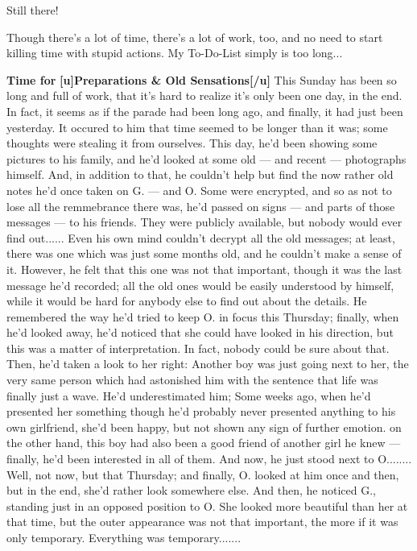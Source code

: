 Still there!

Though there's a lot of time, there's a lot of work, too, and no need to start killing time with stupid actions. My To-Do-List simply is too long...

\textbf{Time for}
\textbf{[u]Preparations & Old Sensations[/u]}
This Sunday has been so long and full of work, that it's hard to realize it's only been one day, in the end. In fact, it seems as if the parade had been long ago, and finally, it had just been yesterday. It occured to him that time seemed to be longer than it was; some thoughts were stealing it from ourselves. 
This day, he'd been showing some pictures to his family, and he'd looked at some old --- and recent --- photographs himself. And, in addition to that, he couldn't help but find the now rather old notes he'd once taken on G. --- and O. Some were encrypted, and so as not to lose all the remmebrance there was, he'd passed on signs --- and parts of those messages --- to his friends. They were publicly available, but nobody would ever find out......
Even his own mind couldn't decrypt all the old messages; at least, there was one which was just some months old, and he couldn't make a sense of it. However, he felt that this one was not that important, though it was the last message he'd recorded; all the old ones would be easily understood by himself, while it would be hard for anybody else to find out about the details. 
He remembered the way he'd tried to keep O. in focus this Thursday; finally, when he'd looked away, he'd noticed that she could have looked in his direction, but this was a matter of interpretation. In fact, nobody could be sure about that. Then, he'd taken a look to her right: Another boy was just going next to her, the very same person which had astonished him with the sentence that life was finally just a wave. He'd underestimated him; Some weeks ago, when he'd presented her something though he'd probably never presented anything to his own girlfriend, she'd been happy, but not shown any sign of further emotion. on the other hand, this boy had also been a good friend of another girl he knew --- finally, he'd been interested in all of them. And now, he just stood next to O........
Well, not now, but that Thursday; and finally, O. looked at him once and then, but in the end, she'd rather look somewhere else. 
And then, he noticed G., standing just in an opposed position to O. She looked more beautiful than her at that time, but the outer appearance was not that important, the more if it was only temporary. 
Everything was temporary.......
